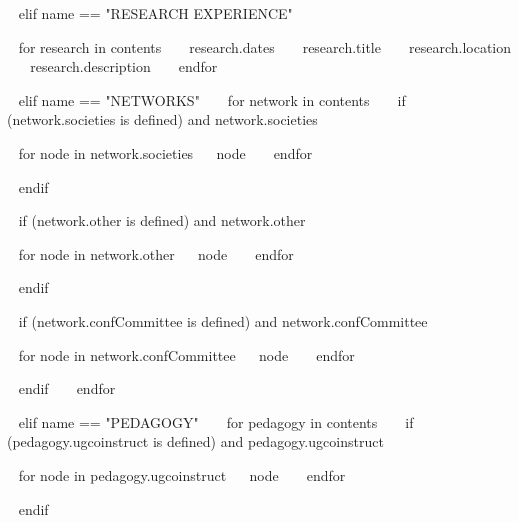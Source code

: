 \begin{minipage}{\textwidth}
~{ elif name == "RESEARCH EXPERIENCE" }~
\begin{entrylist}
~{ for research in contents }~
  \entry
    {~{{ research.dates }}~}
    {~{{ research.title }}~}
    {~{{ research.location }}~}
    {~{{ research.description }}~}
~{ endfor }~
\end{entrylist}


~{ elif name == "NETWORKS" }~
~{ for network in contents }~
  ~{ if (network.societies is defined) and network.societies }~
  \begin{entrylist}[.1]
    ~{ for node in network.societies}~
     \networkentry
      {}
      {~{{ node }}~}
    ~{ endfor }~
  \end{entrylist}
  ~{ endif }~

  ~{ if (network.other is defined) and network.other }~
  \begin{entrylist}[.1]
    ~{ for node in network.other}~
     \networkentry
      {}
      {~{{ node }}~}
    ~{ endfor }~
  \end{entrylist}
  ~{ endif }~

  ~{ if (network.confCommittee is defined) and network.confCommittee }~
  \begin{entrylist}[.1]
    ~{ for node in network.confCommittee}~
     \networkentry
      {}
      {~{{ node }}~}
    ~{ endfor }~
  \end{entrylist}
  ~{ endif }~
~{ endfor }~



~{ elif name == "PEDAGOGY" }~
~{ for pedagogy in contents }~
  ~{ if (pedagogy.ugcoinstruct is defined) and pedagogy.ugcoinstruct }~
  \begin{entrylist}[.1]
    ~{ for node in pedagogy.ugcoinstruct}~
     \pedentry
      {~{{ node }}~}
    ~{ endfor }~
  \end{entrylist}
  ~{ endif }~


\end{minipage}
